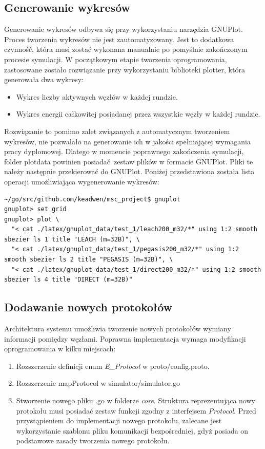 \documentclass[a4paper,12pt,twoside,openany]{report}
\begin{document}
\subsection{Generowanie wykresów}

Generowanie wykresów odbywa się przy wykorzystaniu narzędzia GNUPlot. Proces tworzenia wykresów nie jest zautomatyzowany.
Jest to dodatkowa czynność, która musi zostać wykonana manualnie po pomyślnie zakończonym procesie symulacji.
W początkowym etapie tworzenia oprogramowania, zastosowane zostało rozwiązanie przy wykorzystaniu biblioteki plotter, która
generowała dwa wykresy:

\begin{itemize}
 \item Wykres liczby aktywnych węzłów w każdej rundzie.
 \item Wykres energii całkowitej posiadanej przez wszystkie węzły w każdej rundzie.
\end{itemize}

Rozwiązanie to pomimo zalet związanych z automatycznym tworzeniem wykresów, nie pozwalało na generowanie ich w jakości spełniającej
wymagania pracy dyplomowej. Dlatego w momencie poprawnego zakończenia symulacji, folder plotdata powinien posiadać zestaw plików w formacie GNUPlot.
Pliki te należy następnie przekierować do GNUPlot. Poniżej przedstawiona została lista operacji umożliwiająca wygenerowanie wykresów:

\begin{lstlisting}
~/go/src/github.com/keadwen/msc_project$ gnuplot
gnuplot> set grid
gnuplot> plot \
  "< cat ./latex/gnuplot_data/test_1/leach200_m32/*" using 1:2 smooth sbezier ls 1 title "LEACH (m=32B)", \
  "< cat ./latex/gnuplot_data/test_1/pegasis200_m32/*" using 1:2 smooth sbezier ls 2 title "PEGASIS (m=32B)", \
  "< cat ./latex/gnuplot_data/test_1/direct200_m32/*" using 1:2 smooth sbezier ls 4 title "DIRECT (m=32B)"
\end{lstlisting}

\subsection{Dodawanie nowych protokołów}

Architektura systemu umożliwia tworzenie nowych protokołów wymiany informacji pomiędzy węzłami.
Poprawna implementacja wymaga modyfikacji oprogramowania w kilku miejscach:

\begin{enumerate}
 \item Rozszerzenie definicji enum \textit{E\_Protocol} w proto/config.proto.
 \item Rozszerzenie mapProtocol w simulator/simulator.go
 \item Stworzenie nowego pliku .go w folderze \textit{core}. Struktura reprezentująca nowy protokołu musi posiadać zestaw funkcji zgodny z interfejsem \textit{Protocol}.
       Przed przystąpieniem do implementacji nowego protokołu, zalecane jest wykorzystanie szablonu pliku komunikacji bezpośredniej, gdyż posiada on podstawowe zasady tworzenia nowego protokołu.
\end{enumerate}
\end{document}
